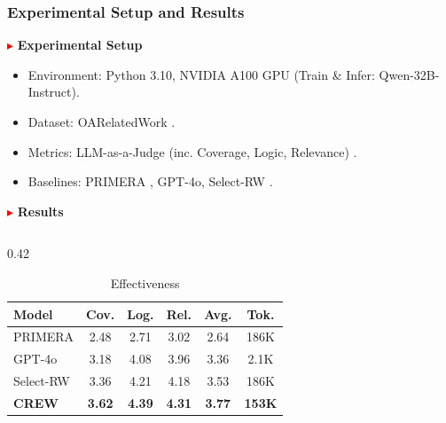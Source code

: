 
\begin{frame}[t]
\vspace{1mm} %
\frametitle{Experimental Setup and Results}

\textcolor{red}{\footnotesize$\blacktriangleright$} \textbf{\footnotesize Experimental Setup}
\begin{itemize}[leftmargin=1.5em, itemsep=0.1em, topsep=0.1em, label=\textcolor{blue!70!black}{\tiny$\bullet$}]
    \footnotesize
    \item Environment: Python 3.10, NVIDIA A100 GPU (Train \& Infer: Qwen-32B-Instruct).
    \item Dataset: OARelatedWork \cite{docekal2024oarelatedwork}.
    \item Metrics: LLM-as-a-Judge (inc. Coverage, Logic, Relevance) \cite{liu2025select}.
    \item Baselines: PRIMERA \cite{xiao2022primera}, GPT-4o, Select-RW \cite{liu2025select}.
\end{itemize}

\vspace{0mm} %

\textcolor{red}{\footnotesize$\blacktriangleright$} \textbf{\footnotesize Results}
\vspace{-6mm} %

\begin{columns}[T]
    \begin{column}{0.42\textwidth}
        \begin{table}[H]
            \caption{Effectiveness}
            \centering
            \tiny
            \vspace{-1.5mm} %
            \begin{tabular}{l c c c c c}
            \toprule
            \textbf{Model} & \textbf{Cov.} & \textbf{Log.} & \textbf{Rel.} & \textbf{Avg.} & \textbf{Tok.} \\
            \midrule
            PRIMERA & 2.48 & 2.71 & 3.02 & 2.64 & 186K \\
            GPT-4o & 3.18 & 4.08 & 3.96 & 3.36 & 2.1K \\
            Select-RW & 3.36 & 4.21 & 4.18 & 3.53 & 186K \\
            \midrule
            \textbf{CREW} & \textbf{3.62} & \textbf{4.39} & \textbf{4.31} & \textbf{3.77} & \textbf{153K} \\
            \bottomrule
            \end{tabular}
        \end{table}
    \end{column}
    

\end{columns}
\end{frame}
